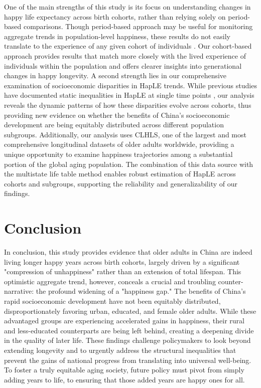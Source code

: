 \documentclass[12pt, a4paper]{article}
\begin{document}
One of the main strengths of this study is its focus on understanding changes in happy life expectancy across birth cohorts, rather than relying solely on period-based comparisons. Though period-based approach may be useful for monitoring aggregate trends in population-level happiness, these results do not easily translate to the experience of any given cohort of individuals \autocite{payne.2022.expansion}. Our cohort-based approach provides results that match more closely with the lived experience of individuals within the population and offers clearer insights into generational changes in happy longevity. A second strength lies in our comprehensive examination of socioeconomic disparities in HapLE trends. While previous studies have documented static inequalities in HapLE at single time points \autocite{wan.2024.socioeconomic}, our analysis reveals the dynamic patterns of how these disparities evolve across cohorts, thus providing new evidence on whether the benefits of China's socioeconomic development are being equitably distributed across different population subgroups. Additionally, our analysis uses CLHLS, one of the largest and most comprehensive longitudinal datasets of older adults worldwide, providing a unique opportunity to examine happiness trajectories among a substantial portion of the global aging population. The combination of this data source with the multistate life table method enables robust estimation of HapLE across cohorts and subgroups, supporting the reliability and generalizability of our findings.
\section{Conclusion}

In conclusion, this study provides evidence that older adults in China are indeed living longer happy years across birth cohorts, largely driven by a significant "compression of unhappiness" rather than an extension of total lifespan. This optimistic aggregate trend, however, conceals a crucial and troubling counter-narrative: the profound widening of a "happiness gap." The benefits of China's rapid socioeconomic development have not been equitably distributed, disproportionately favoring urban, educated, and female older adults. While these advantaged groups are experiencing accelerated gains in happiness, their rural and less-educated counterparts are being left behind, creating a deepening divide in the quality of later life. These findings challenge policymakers to look beyond extending longevity and to urgently address the structural inequalities that prevent the gains of national progress from translating into universal well-being. To foster a truly equitable aging society, future policy must pivot from simply adding years to life, to ensuring that those added years are happy ones for all.
\end{document}

